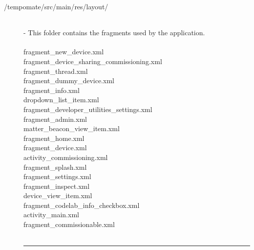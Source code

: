 \begin{enumerate}[label=\alph*]
\begin{description}
    \item[/tempomate/src/main/res/layout/] \hfill \\
    \small
    - This folder contains the fragments used by the application.\\\\
    \footnotesize
        fragment\_new\_device.xml  \\
        fragment\_device\_sharing\_commissioning.xml  \\
        fragment\_thread.xml  \\
        fragment\_dummy\_device.xml  \\
        fragment\_info.xml  \\
        dropdown\_list\_item.xml  \\
        fragment\_developer\_utilities\_settings.xml  \\
        fragment\_admin.xml  \\
        matter\_beacon\_view\_item.xml  \\
        fragment\_home.xml  \\
        fragment\_device.xml  \\
        activity\_commissioning.xml  \\
        fragment\_splash.xml  \\
        fragment\_settings.xml  \\
        fragment\_inspect.xml  \\
        device\_view\_item.xml  \\
        fragment\_codelab\_info\_checkbox.xml  \\
        activity\_main.xml  \\
        fragment\_commissionable.xml  \\\\

            \vspace{-0.2cm}
      \hrule
      \vspace{0.2cm}
      

\end{description}
\end{enumerate}
